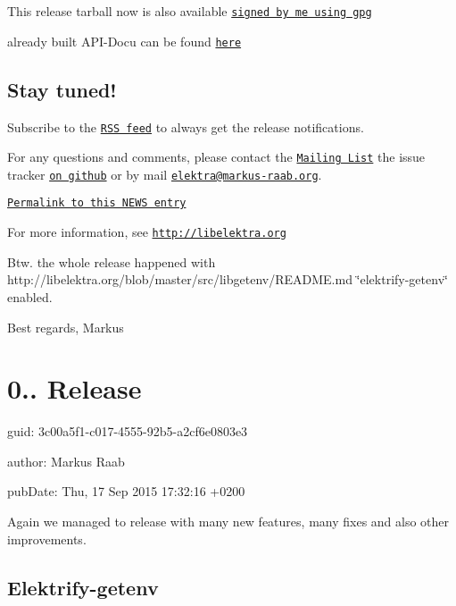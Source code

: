 This release tarball now is also available \href{http://www.libelektra.org/ftp/elektra/releases/elektra-0.8.14.tar.gz.gpg}{\tt signed by me using gpg}

already built A\+P\+I-\/\+Docu can be found \href{http://doc.libelektra.org/api/0.8.14/html/}{\tt here}

\subsection*{Stay tuned!}

Subscribe to the \href{http://doc.libelektra.org/news/feed.rss}{\tt R\+S\+S feed} to always get the release notifications.

For any questions and comments, please contact the \href{https://lists.sourceforge.net/lists/listinfo/registry-list}{\tt Mailing List} the issue tracker \href{http://git.libelektra.org/issues}{\tt on github} or by mail \href{mailto:elektra@markus-raab.org}{\tt elektra@markus-\/raab.\+org}.

\href{http://doc.libelektra.org/news/519cbfac-6db5-4594-8a38-dec4c84b134f.html}{\tt Permalink to this N\+E\+W\+S entry}

For more information, see \href{http://libelektra.org}{\tt http\+://libelektra.\+org}

Btw. the whole release happened with http\+://libelektra.org/blob/master/src/libgetenv/\+R\+E\+A\+D\+M\+E.\+md \char`\"{}elektrify-\/getenv\char`\"{} enabled.

Best regards, Markus

\section*{0.. Release}


\begin{DoxyItemize}
\item guid\+: 3c00a5f1-\/c017-\/4555-\/92b5-\/a2cf6e0803e3
\item author\+: Markus Raab
\item pub\+Date\+: Thu, 17 Sep 2015 17\+:32\+:16 +0200
\end{DoxyItemize}

Again we managed to release with many new features, many fixes and also other improvements.

\subsection*{Elektrify-\/getenv}

